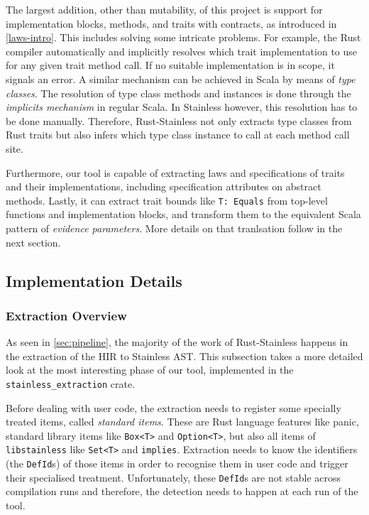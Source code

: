 The largest addition, other than mutability, of this project is support for
implementation blocks, methods, and traits with contracts, as introduced in
\autoref{laws-intro}. This includes solving some intricate problems. For
example, the Rust compiler automatically and implicitly resolves which trait
implementation to use for any given trait method call. If no suitable
implementation is in scope, it signals an error.  A similar mechanism can be
achieved in Scala by means of \emph{type classes}. The resolution of type class
methods and instances is done through the \emph{implicits mechanism} in regular
Scala. In Stainless however, this resolution has to be done manually. Therefore,
Rust-Stainless not only extracts type classes from Rust traits but also infers
which type class instance to call at each method call site.

Furthermore, our tool is capable of extracting laws and specifications of traits
and their implementations, including specification attributes on abstract
methods. Lastly, it can extract  trait bounds like \passthrough{\lstinline!T:
Equals!} from top-level functions and implementation blocks, and transform them
to the equivalent Scala pattern of \emph{evidence parameters}. More details on
that tranlsation follow in the next section.



\subsection{Implementation Details}

\subsubsection{Extraction Overview}
\label{sec:extraction-overview}

As seen in \autoref{sec:pipeline}, the majority of the work of Rust-Stainless
happens in the extraction of the HIR to Stainless AST. This subsection takes a
more detailed look at the most interesting phase of our tool, implemented in the
\lstinline!stainless_extraction! crate.

Before dealing with user code, the extraction needs to register some specially
treated items, called \emph{standard items}. These are Rust language features
like panic, standard library items like \lstinline!Box<T>! and
\lstinline!Option<T>!, but also all items of \lstinline!libstainless! like
\lstinline!Set<T>! and \lstinline!implies!. Extraction needs to know the
identifiers (the \lstinline!DefId!s) of those items in order to recognise them
in user code and trigger their specialised treatment. Unfortunately, these
\lstinline!DefId!s are not stable across compilation runs and therefore, the
detection needs to happen at each run of the tool.

